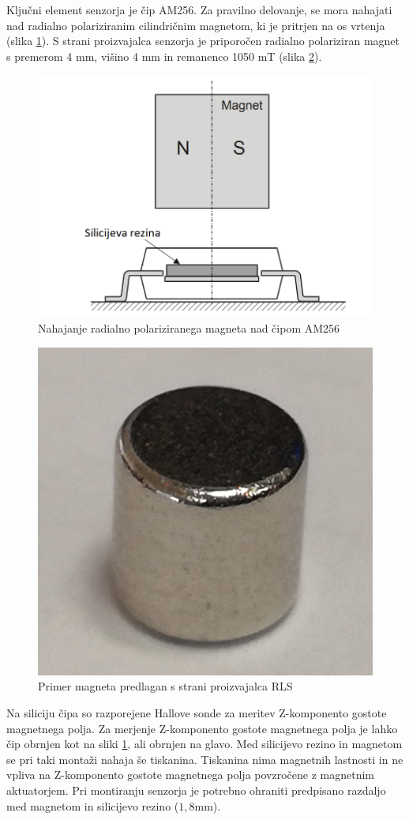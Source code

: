 Ključni element senzorja je čip AM256. Za pravilno delovanje, se mora nahajati nad radialno polariziranim cilindričnim magnetom, ki je pritrjen na os vrtenja (slika \ref{stranski_ris}).
S strani proizvajalca senzorja je priporočen radialno polariziran magnet s premerom 4 mm, višino 4 mm in remanenco 1050 mT (slika \ref{magnet4mm}).
\begin{figure}[ht]
	\centering
	\includegraphics[width=0.5\columnwidth]{./Slike/stranski_ris.png}
	\caption{Nahajanje radialno polariziranega magneta nad čipom AM256 \cite{AM8192}}
	\label{stranski_ris}
\end{figure}
\begin{figure}[ht]
	\centering
	\includegraphics[width=0.35\columnwidth]{./Slike/magnet4mm.png}
	\caption{Primer magneta predlagan s strani proizvajalca RLS}
	\label{magnet4mm}
\end{figure}

Na siliciju čipa so razporejene Hallove sonde za meritev Z-komponento gostote magnetnega polja. Za merjenje Z-komponento gostote magnetnega polja je lahko čip obrnjen kot na sliki \ref{stranski_ris}, ali
obrnjen na glavo. Med silicijevo rezino in magnetom se pri taki montaži nahaja še tiskanina. Tiskanina nima magnetnih lastnosti in ne vpliva na Z-komponento gostote magnetnega polja povzročene z magnetnim aktuatorjem. Pri montiranju senzorja je potrebno ohraniti predpisano
razdaljo med magnetom in silicijevo rezino ($1,8 \mathrm{mm}$).

